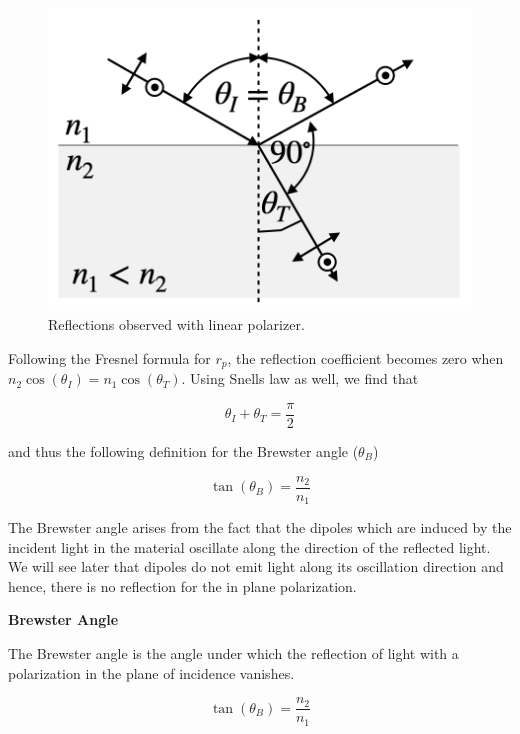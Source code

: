 \documentclass[
  a4paper,
]{book}
\begin{document}
\begin{figure}[H]

{\centering \includegraphics[width=0.4\linewidth,height=\textheight,keepaspectratio]{electromagnetic-waves/img/Brewster.png}

}

\caption{Reflections observed with linear polarizer.}

\end{figure}%

Following the Fresnel formula for \(r_p\), the reflection coefficient
becomes zero when \(n_2\cos(\theta_I)=n_1\cos(\theta_T)\). Using Snells
law as well, we find that

\[
\theta_I+\theta_T=\frac{\pi}{2}
\]

and thus the following definition for the Brewster angle (\(\theta_B\))

\[
\tan(\theta_B)=\frac{n_2}{n_1}
\]

The Brewster angle arises from the fact that the dipoles which are
induced by the incident light in the material oscillate along the
direction of the reflected light. We will see later that dipoles do not
emit light along its oscillation direction and hence, there is no
reflection for the in plane polarization.

\begin{tcolorbox}[enhanced jigsaw, coltitle=black, title=\textcolor{quarto-callout-note-color}{\faInfo}\hspace{0.5em}{Note}, colframe=quarto-callout-note-color-frame, toprule=.15mm, opacitybacktitle=0.6, left=2mm, opacityback=0, breakable, toptitle=1mm, bottomtitle=1mm, leftrule=.75mm, arc=.35mm, titlerule=0mm, colbacktitle=quarto-callout-note-color!10!white, rightrule=.15mm, bottomrule=.15mm, colback=white]

\textbf{Brewster Angle}

The Brewster angle is the angle under which the reflection of light with
a polarization in the plane of incidence vanishes.

\[
\tan(\theta_B)=\frac{n_2}{n_1}
\]

\end{tcolorbox}
\end{document}

